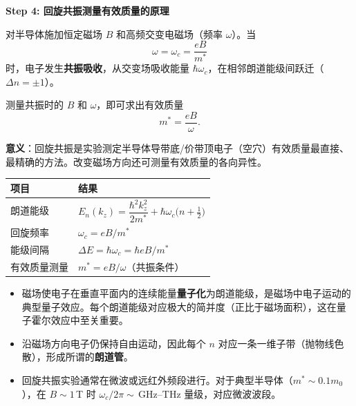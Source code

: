 \begin{derivationbox}[标准解题过程]
\textbf{Step 4: 回旋共振测量有效质量的原理}

对半导体施加恒定磁场 $B$ 和高频交变电磁场（频率 $\omega$）。当
\begin{equation}
\omega=\omega_c=\frac{eB}{m^*}
\end{equation}
时，电子发生\textbf{共振吸收}，从交变场吸收能量 $\hbar\omega_c$，在相邻朗道能级间跃迁（$\Delta n=\pm1$）。

测量共振时的 $B$ 和 $\omega$，即可求出有效质量
\begin{equation}
\boxed{m^*=\frac{eB}{\omega}.}
\end{equation}

\textbf{意义}：回旋共振是实验测定半导体导带底/价带顶电子（空穴）有效质量最直接、最精确的方法。改变磁场方向还可测量有效质量的各向异性。
\end{derivationbox}

\begin{formulabox}[答案汇总]
\begin{center}
\begin{tabular}{ll}
\toprule
\textbf{项目} & \textbf{结果} \\
\midrule
朗道能级 & $E_n(k_z)=\dfrac{\hbar^2k_z^2}{2m^*}+\hbar\omega_c\bigl(n+\tfrac12\bigr)$ \\
回旋频率 & $\omega_c=eB/m^*$ \\
能级间隔 & $\Delta E=\hbar\omega_c=\hbar eB/m^*$ \\
有效质量测量 & $m^*=eB/\omega$（共振条件） \\
\bottomrule
\end{tabular}
\end{center}
\end{formulabox}

\begin{insightbox}[物理图像]
\begin{itemize}
    \item 磁场使电子在垂直平面内的连续能量\textbf{量子化}为朗道能级，是磁场中电子运动的典型量子效应。每个朗道能级对应极大的简并度（正比于磁场面积），这在量子霍尔效应中至关重要。
    \item 沿磁场方向电子仍保持自由运动，因此每个 $n$ 对应一条一维子带（抛物线色散），形成所谓的\textbf{朗道管}。
    \item 回旋共振实验通常在微波或远红外频段进行。对于典型半导体（$m^*\sim0.1m_0$），在 $B\sim1\,$T 时 $\omega_c/2\pi\sim$\,GHz--THz 量级，对应微波波段。
\end{itemize}
\end{insightbox}
